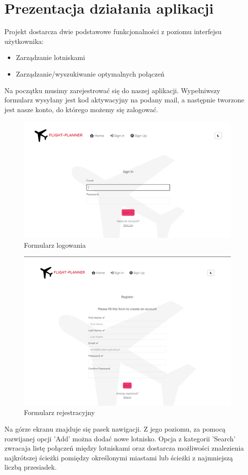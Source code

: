\documentclass[12pt]{article}
\begin{document}
\section{Prezentacja działania aplikacji}
Projekt dostarcza dwie podstawowe funkcjonalności z poziomu interfejsu
użytkownika: 
\begin{itemize}
    \item Zarządzanie lotniskami
    \item Zarządzanie/wyszukiwanie optymalnych połączeń
\end{itemize}
Na początku musimy zarejestrować się do naszej aplikacji. Wypełniwszy formularz wysyłany jest kod aktywacyjny na podany mail, a następnie tworzone jest nasze konto, do którego możemy się zalogować.\\
\begin{figure}[!ht]
    \centering
    \includegraphics[width=0.6\linewidth]{1} 
    \caption{Formularz logowania}
\end{figure}
\begin{figure}[!ht]
    \centering
    \includegraphics[width=0.7\linewidth]{2} 
    \caption{Formularz rejestracyjny}
\end{figure}
\newpage
Na górze ekranu znajduje się pasek nawigacji. Z jego poziomu, za pomocą rozwijanej opcji 'Add' można dodać nowe lotnisko. Opcja z kategorii 'Search' zwracaja listę połączeń między lotniskami oraz dostarcza możliwości znalezienia najkrótszej ścieżki pomiędzy określonymi miastami lub ścieżki z najmniejszą liczbą przesiadek.
\end{document}

